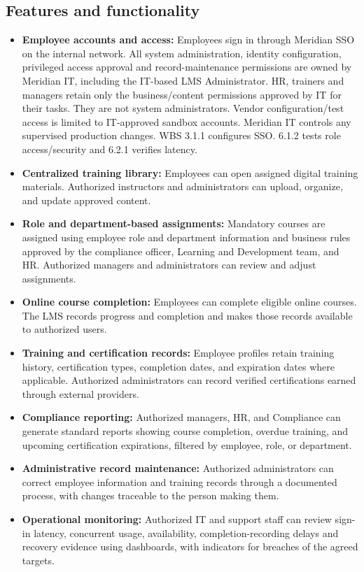 \subsection{Features and functionality}\label{sec:1.3}
\begin{itemize}
\item \textbf{Employee accounts and access:} Employees sign in through Meridian SSO on the internal network. All system administration, identity configuration, privileged access approval and record-maintenance permissions are owned by Meridian IT, including the IT-based LMS Administrator. HR, trainers and managers retain only the business/\allowbreak{}content permissions approved by IT for their tasks. They are not system administrators. Vendor configuration/\allowbreak{}test access is limited to IT-approved sandbox accounts. Meridian IT controls any supervised production changes. WBS 3.1.1 configures SSO. 6.1.2 tests role access/\allowbreak{}security and 6.2.1 verifies latency.
\item \textbf{Centralized training library:} Employees can open assigned digital training materials. Authorized instructors and administrators can upload, organize, and update approved content.
\item \textbf{Role and department-based assignments:} Mandatory courses are assigned using employee role and department information and business rules approved by the compliance officer, Learning and Development team, and HR. Authorized managers and administrators can review and adjust assignments.
\item \textbf{Online course completion:} Employees can complete eligible online courses. The LMS records progress and completion and makes those records available to authorized users.
\item \textbf{Training and certification records:} Employee profiles retain training history, certification types, completion dates, and expiration dates where applicable. Authorized administrators can record verified certifications earned through external providers.
\item \textbf{Compliance reporting:} Authorized managers, HR, and Compliance can generate standard reports showing course completion, overdue training, and upcoming certification expirations, filtered by employee, role, or department.
\item \textbf{Administrative record maintenance:} Authorized administrators can correct employee information and training records through a documented process, with changes traceable to the person making them.
\item \textbf{Operational monitoring:} Authorized IT and support staff can review sign-in latency, concurrent usage, availability, completion-recording delays and recovery evidence using dashboards, with indicators for breaches of the agreed targets.
\end{itemize}


